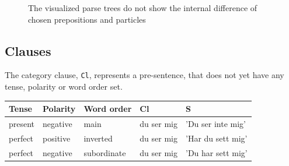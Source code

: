 \documentclass{report}
\begin{document}
\begin{figure}[h]
\hspace{10mm}
\caption{The visualized parse trees do not show the internal difference of chosen prepositions and particles}
\label{fig:translationtrees}
\end{figure}


\subsection{Clauses}
The category clause, \verb-Cl-, represents a pre-sentence, that does not yet have any tense, polarity
or word order set.\\

\begin{tabular}{|lll|ll|}
\hline
\textbf{Tense} &\textbf{Polarity} &\textbf{Word order} &\textbf{Cl} &\textbf{S} \\
\hline
present &negative & main        & du ser mig & 'Du ser inte mig'\\
perfect &positive & inverted    & du ser mig & 'Har du sett mig'\\
perfect &negative & subordinate & du ser mig & 'Du har sett mig'\\
\hline
\end{tabular}\\
\end{document}
